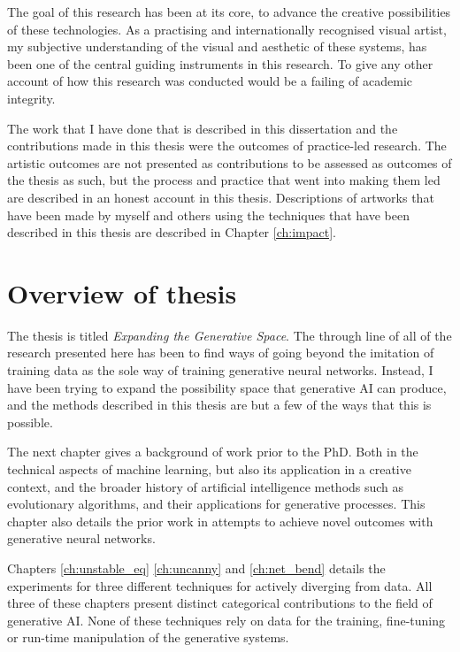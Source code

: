 The goal of this research has been at its core, to advance the creative possibilities of these technologies. 
As a practising and internationally recognised visual artist, my subjective understanding of the visual and aesthetic of these systems, has been one of the central guiding instruments in this research. 
To give any other account of how this research was conducted would be a failing of academic integrity. 

The work that I have done that is described in this dissertation and the contributions made in this thesis were the outcomes of practice-led research. 
The artistic outcomes are not presented as contributions to be assessed as outcomes of the thesis as such, but the process and practice that went into making them led are described in an honest account in this thesis. 
Descriptions of artworks that have been made by myself and others using the techniques that have been described in this thesis are described in Chapter \ref{ch:impact}.

\section{Overview of thesis}

The thesis is titled \textit{Expanding the Generative Space}. 
The through line of all of the research presented here has been to find ways of going beyond the imitation of training data as the sole way of training generative neural networks. 
Instead, I have been trying to expand the possibility space that generative AI can produce, and the methods described in this thesis are but a few of the ways that this is possible. 

The next chapter gives a background of work prior to the PhD. 
Both in the technical aspects of machine learning, but also its application in a creative context, and the broader history of artificial intelligence methods such as evolutionary algorithms, and their applications for generative processes. 
This chapter also details the prior work in attempts to achieve novel outcomes with generative neural networks.

Chapters \ref{ch:unstable_eq} \ref{ch:uncanny} and \ref{ch:net_bend} details the experiments for three different techniques for actively diverging from data. 
All three of these chapters present distinct categorical contributions to the field of generative AI. 
None of these techniques rely on data for the training, fine-tuning or run-time manipulation of the generative systems. 

